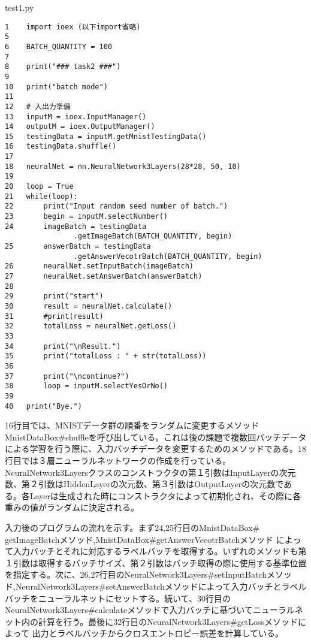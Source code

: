 \documentclass{ujarticle} %
\begin{document}
\begin{itembox}[l]{test1.py}
  \begin{verbatim}
1    import ioex (以下import省略)
5
6    BATCH_QUANTITY = 100
7
8    print("### task2 ###")
9
10   print("batch mode")
11
12   # 入出力準備
13   inputM = ioex.InputManager()
14   outputM = ioex.OutputManager()
15   testingData = inputM.getMnistTestingData()
16   testingData.shuffle()
17
18   neuralNet = nn.NeuralNetwork3Layers(28*28, 50, 10)
19
20   loop = True
21   while(loop):
22       print("Input random seed number of batch.")
23       begin = inputM.selectNumber()
24       imageBatch = testingData
                .getImageBatch(BATCH_QUANTITY, begin)
25       answerBatch = testingData
                .getAnswerVecotrBatch(BATCH_QUANTITY, begin)
26       neuralNet.setInputBatch(imageBatch)
27       neuralNet.setAnswerBatch(answerBatch)
28
29       print("start")
30       result = neuralNet.calculate()
31       #print(result)
32       totalLoss = neuralNet.getLoss()
33
34       print("\nResult.")
35       print("totalLoss : " + str(totalLoss))
36
37       print("\ncontinue?")
38       loop = inputM.selectYesOrNo()
39
40   print("Bye.")
  \end{verbatim}
\end{itembox}

16行目では、MNISTデータ群の順番をランダムに変更するメソッドMnistDataBox\#shuffleを呼び出している。これは後の課題で複数回バッチデータによる学習を行う際に、入力バッチデータを変更するためのメソッドである。18行目では３層ニューラルネットワークの作成を行っている。NeuralNetwork3Layersクラスのコンストラクタの第１引数はInputLayerの次元数、第２引数はHiddenLayerの次元数、第３引数はOutputLayerの次元数である。各Layerは生成された時にコンストラクタによって初期化され、その際に各重みの値がランダムに決定される。

入力後のプログラムの流れを示す。まず24,25行目のMnistDataBox\# getImageBatchメソッド,MnistDataBox\#getAnswerVecotrBatchメソッド によって入力バッチとそれに対応するラベルバッチを取得する。いずれのメソッドも第１引数は取得するバッチサイズ、第２引数はバッチ取得の際に使用する基準位置を指定する。次に、26,27行目のNeuralNetwork3Layers\#setInputBatchメソッド,NeuralNetwork3Layers\#setAnswerBatchメソッドによって入力バッチとラベルバッチをニューラルネットにセットする。続いて、30行目のNeuralNetwork3Layers\#calculateメソッドで入力バッチに基づいてニューラルネット内の計算を行う。最後に32行目のNeuralNetwork3Layers\#getLossメソッドによって 出力とラベルバッチからクロスエントロピー誤差を計算している。
\end{document}
